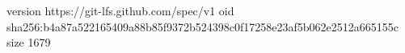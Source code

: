 version https://git-lfs.github.com/spec/v1
oid sha256:b4a87a522165409a88b85f9372b524398c0f17258e23af5b062e2512a665155c
size 1679
